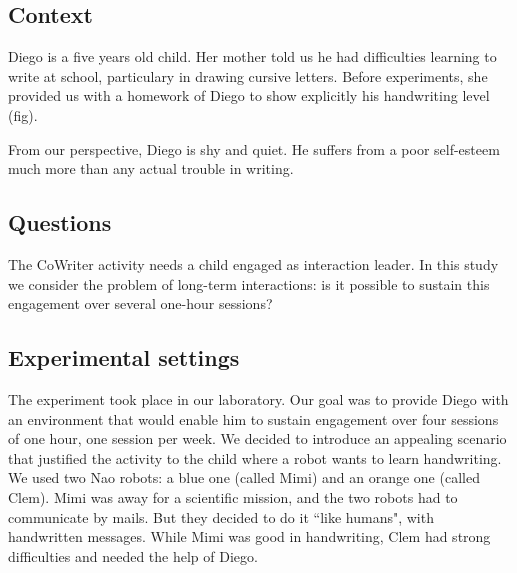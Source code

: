 \documentclass{sig-alternate}
\begin{document}
\subsection{Context}
Diego is a five years old child. Her mother told us he had difficulties learning
to write at school, particulary in drawing cursive letters. Before experiments,
she provided us with a homework of Diego to show explicitly his handwriting
level (fig). 

From our perspective, Diego is shy and quiet. He suffers from a poor
self-esteem much more than any actual trouble in writing.

\subsection{Questions}

The CoWriter activity needs a child engaged as interaction leader. 
In this study we consider the problem of long-term interactions: is it possible to
sustain this engagement over several one-hour sessions?



\subsection{Experimental settings}

The experiment took place in our laboratory. Our goal was to provide Diego with
an environment that would enable him to sustain engagement over four sessions 
of one hour, one session per week. We decided 
to introduce an appealing scenario that justified the activity to the child
where a robot wants to learn handwriting. We used two Nao robots: a blue one 
(called Mimi) and an orange one (called Clem). Mimi was away for a 
scientific mission, and the two robots had to communicate by mails. But they decided to do it 
``like humans", with handwritten messages. While Mimi was good in handwriting, 
Clem had strong difficulties and needed the help of Diego.
\end{document}

